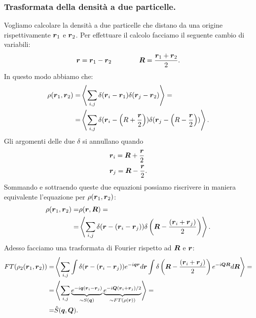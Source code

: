 \subsubsection{Trasformata della densità a due particelle.}
\label{subsubsec:Trasformata della densità a due particelle.}
Vogliamo calcolare la densità a due particelle che distano da una origine rispettivamente $\boldsymbol{r}_1$ e $\boldsymbol{r}_2$. Per effettuare il calcolo facciamo il seguente cambio di variabili:
\[\begin{aligned}
	&\boldsymbol{r} = \boldsymbol{r}_1-\boldsymbol{r}_2 &&&&&&
	&\boldsymbol{R} = \frac{\boldsymbol{r}_1 + \boldsymbol{r}_2}{2}
.\end{aligned}\]
In questo modo abbiamo che:
\[\begin{aligned}
	\rho (\boldsymbol{r}_1,\boldsymbol{r}_2) 
	=&
	\left<\sum_{i,j}^{} \delta(\boldsymbol{r}_i - \boldsymbol{r}_1)\delta(\boldsymbol{r}_j - \boldsymbol{r}_2) \right> =\\
	=&
	\left<\sum_{i,j}^{} \delta(\boldsymbol{r}_i - \left( R + \frac{\boldsymbol{r}}{2} \right) )\delta(\boldsymbol{r}_j - \left( R - \frac{\boldsymbol{r}}{2} \right)) \right> 
.\end{aligned}\]
Gli argomenti delle due $\delta$ si annullano quando
\[\begin{aligned}
	& \boldsymbol{r}_i = \boldsymbol{R}+\frac{\boldsymbol{r}}{2}\\
	&\boldsymbol{r}_j = \boldsymbol{R}- \frac{\boldsymbol{r}}{2}
.\end{aligned}\]
Sommando e sottraendo queste due equazioni possiamo riscrivere in maniera equivalente l'equazione per $\rho (\boldsymbol{r}_1,\boldsymbol{r}_2)$:
\[\begin{aligned}
	\rho (\boldsymbol{r}_1, \boldsymbol{r}_2) = &
	\rho (\boldsymbol{r},\boldsymbol{R}) =\\
	=&
	\left< \sum_{i,j}^{} \delta(\boldsymbol{r}-\left( \boldsymbol{r}_i-\boldsymbol{r}_j \right))\delta\left(  \boldsymbol{R}- \frac{\left( \boldsymbol{r}_i + \boldsymbol{r}_j \right) }{2} \right)  \right>
.\end{aligned}\]
Adesso facciamo una trasformata di Fourier rispetto ad $\boldsymbol{R}$ e $\boldsymbol{r}$:
\[\begin{aligned}
	FT(\rho_2 (\boldsymbol{r}_1,\boldsymbol{r}_2)) =&
	\left<\sum_{i,j}^{} \int \delta(\boldsymbol{r} - \left( \boldsymbol{r}_i -\boldsymbol{r}_j \right) )e^{-i \boldsymbol{q}\boldsymbol{r}}d \boldsymbol{r} 
	\int \delta \left( \boldsymbol{R} - \frac{\left( \boldsymbol{r}_i +\boldsymbol{r}_j \right)}{2}  \right) e^{-i \boldsymbol{Q}\boldsymbol{R}}d \boldsymbol{R} \right> =\\
	=&
	\left<\sum_{i,j}^{} 
	\underbrace{
	e^{-i \boldsymbol{q}\left( \boldsymbol{r}_i - \boldsymbol{r}_j \right) } 
	}_{\sim S(\boldsymbol{q})}
	\underbrace{
	e^{-i \boldsymbol{Q}\left( \boldsymbol{r}_i + \boldsymbol{r}_j \right)/2 }
	}_{\sim FT(\rho (\boldsymbol{r}))}
	\right>=\\
	=& \hat{S}(\boldsymbol{q},\boldsymbol{Q})
.\end{aligned}\]

